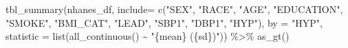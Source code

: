 \documentclass[
  letterpaper,
]{krantz}
\makeatletter
\newenvironment{Shaded}{\begin{snugshade}}{\end{snugshade}}
\newcommand{\AttributeTok}[1]{\textcolor[rgb]{0.40,0.45,0.13}{#1}}
\newcommand{\FunctionTok}[1]{\textcolor[rgb]{0.28,0.35,0.67}{#1}}
\newcommand{\NormalTok}[1]{\textcolor[rgb]{0.00,0.23,0.31}{#1}}
\newcommand{\SpecialCharTok}[1]{\textcolor[rgb]{0.37,0.37,0.37}{#1}}
\newcommand{\StringTok}[1]{\textcolor[rgb]{0.13,0.47,0.30}{#1}}
\newenvironment{kframe}{%
\medskip{}
\setlength{\fboxsep}{.8em}
 \def\at@end@of@kframe{}%
 \ifinner\ifhmode%
  \def\at@end@of@kframe{\end{minipage}}%
  \begin{minipage}{\columnwidth}%
 \fi\fi%
 \def\FrameCommand##1{\hskip\@totalleftmargin \hskip-\fboxsep
 \colorbox{shadecolor}{##1}\hskip-\fboxsep
     \hskip-\linewidth \hskip-\@totalleftmargin \hskip\columnwidth}%
 \MakeFramed {\advance\hsize-\width
   \@totalleftmargin\z@ \linewidth\hsize
   \@setminipage}}%
 {\par\unskip\endMakeFramed%
 \at@end@of@kframe}
\renewenvironment{Shaded}{\begin{kframe}}{\end{kframe}}
\makeatother
\begin{document}
\begin{Shaded}
\begin{Highlighting}[]
\FunctionTok{tbl\_summary}\NormalTok{(nhanes\_df, }\AttributeTok{include=} \FunctionTok{c}\NormalTok{(}\StringTok{"SEX"}\NormalTok{, }\StringTok{"RACE"}\NormalTok{, }\StringTok{"AGE"}\NormalTok{, }\StringTok{"EDUCATION"}\NormalTok{, }
                                  \StringTok{"SMOKE"}\NormalTok{, }\StringTok{"BMI\_CAT"}\NormalTok{, }\StringTok{"LEAD"}\NormalTok{, }\StringTok{"SBP1"}\NormalTok{, }
                                  \StringTok{"DBP1"}\NormalTok{, }\StringTok{"HYP"}\NormalTok{),}
           \AttributeTok{by =} \StringTok{"HYP"}\NormalTok{, }
           \AttributeTok{statistic =} \FunctionTok{list}\NormalTok{(}\FunctionTok{all\_continuous}\NormalTok{() }\SpecialCharTok{\textasciitilde{}} \StringTok{"\{mean\} (\{sd\})"}\NormalTok{)) }\SpecialCharTok{\%\textgreater{}\%} 
  \FunctionTok{as\_gt}\NormalTok{() }
\end{Highlighting}
\end{Shaded}
\end{document}
